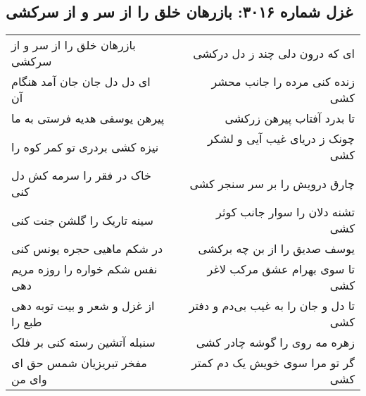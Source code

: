 \begin{center}
\section*{غزل شماره ۳۰۱۶: بازرهان خلق را از سر و از سرکشی}
\label{sec:3016}
\begin{longtable}{l p{0.5cm} r}
بازرهان خلق را از سر و از سرکشی
&&
ای که درون دلی چند ز دل درکشی
\\
ای دل دل جان جان آمد هنگام آن
&&
زنده کنی مرده را جانب محشر کشی
\\
پیرهن یوسفی هدیه فرستی به ما
&&
تا بدرد آفتاب پیرهن زرکشی
\\
نیزه کشی بردری تو کمر کوه را
&&
چونک ز دریای غیب آیی و لشکر کشی
\\
خاک در فقر را سرمه کش دل کنی
&&
چارق درویش را بر سر سنجر کشی
\\
سینه تاریک را گلشن جنت کنی
&&
تشنه دلان را سوار جانب کوثر کشی
\\
در شکم ماهیی حجره یونس کنی
&&
یوسف صدیق را از بن چه برکشی
\\
نفس شکم خواره را روزه مریم دهی
&&
تا سوی بهرام عشق مرکب لاغر کشی
\\
از غزل و شعر و بیت توبه دهی طبع را
&&
تا دل و جان را به غیب بی‌دم و دفتر کشی
\\
سنبله آتشین رسته کنی بر فلک
&&
زهره مه روی را گوشه چادر کشی
\\
مفخر تبریزیان شمس حق ای وای من
&&
گر تو مرا سوی خویش یک دم کمتر کشی
\\
\end{longtable}
\end{center}
